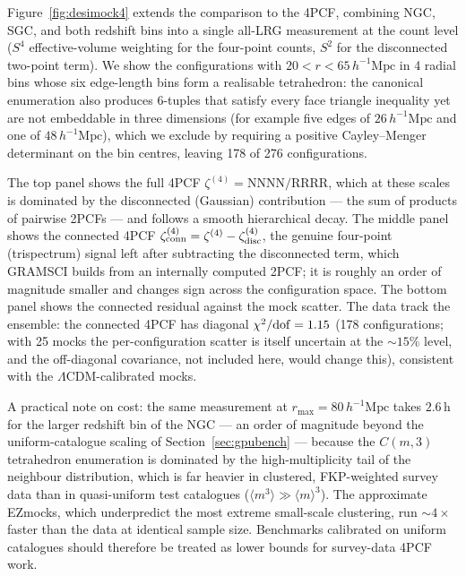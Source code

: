 \documentclass[twocolumn]{aastex701}
\newcommand{\rmax}{r_{\mathrm{max}}}
\newcommand{\Mpch}{\,h^{-1}\mathrm{Mpc}}
\begin{document}
Figure~\ref{fig:desimock4} extends the comparison to the 4PCF, combining
NGC, SGC, and both redshift bins into a single all-LRG measurement at the
count level ($S^4$ effective-volume weighting for the four-point counts,
$S^2$ for the disconnected two-point term).  We show the configurations
with $20 < r < 65\Mpch$ in 4 radial bins whose six edge-length bins form
a realisable tetrahedron: the canonical enumeration also produces
6-tuples that satisfy every face triangle inequality yet are not
embeddable in three dimensions (for example five edges of $26\Mpch$ and
one of $48\Mpch$), which we exclude by requiring a positive
Cayley--Menger determinant on the bin centres, leaving 178 of 276
configurations.

The top panel shows the full 4PCF
$\zeta^{(4)} = \mathrm{NNNN}/\mathrm{RRRR}$, which at these scales is
dominated by the disconnected (Gaussian) contribution --- the sum of
products of pairwise 2PCFs --- and follows a smooth hierarchical decay.
The middle panel shows the connected 4PCF
$\zeta^{(4)}_{\rm conn} = \zeta^{(4)} - \zeta^{(4)}_{\rm disc}$, the
genuine four-point (trispectrum) signal left after subtracting the
disconnected term, which GRAMSCI builds from an internally computed 2PCF;
it is roughly an order of magnitude smaller and changes sign across the
configuration space.  The bottom panel shows the connected residual
against the mock scatter.  The data track the ensemble: the connected
4PCF has diagonal $\chi^2/{\rm dof} = 1.15$ (178 configurations; with 25
mocks the per-configuration scatter is itself uncertain at the
${\sim}15\%$ level, and the off-diagonal covariance, not included here,
would change this), consistent with the $\Lambda$CDM-calibrated mocks.

A practical note on cost: the same measurement at $\rmax = 80\Mpch$
takes $2.6$\,h for the larger redshift bin of the NGC --- an order of
magnitude beyond the uniform-catalogue scaling of
Section~\ref{sec:gpubench} --- because the $C(m,3)$ tetrahedron
enumeration is dominated by the high-multiplicity tail of the neighbour
distribution, which is far heavier in clustered, FKP-weighted survey
data than in quasi-uniform test catalogues ($\langle m^3 \rangle \gg
\langle m \rangle^3$).  The approximate EZmocks, which underpredict
the most extreme small-scale clustering, run ${\sim}4\times$ faster
than the data at identical sample size.  Benchmarks calibrated on
uniform catalogues should therefore be treated as lower bounds for
survey-data 4PCF work.
\end{document}
